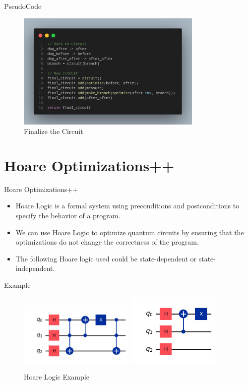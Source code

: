 \documentclass[10pt]{beamer}
\begin{document}
\begin{frame}{PseudoCode}
  \begin{figure}
    \centering
    \includegraphics[width=0.8\textwidth]{Images/code_4.png}
    \caption{Finalize the Circuit}
  \end{figure}
\end{frame}

\section{Hoare Optimizations++}
\begin{frame}{Hoare Optimizations++}
  \begin{itemize}
    \item Hoare Logic is a formal system using preconditions and postconditions to specify the behavior of a program.
    \item We can use Hoare Logic to optimize quantum circuits by ensuring that the optimizations do not change the correctness of the program.
    \item The following Hoare logic used could be state-dependent or state-independent.
  \end{itemize}
\end{frame}

\begin{frame}{Example}
  \begin{figure}
    \centering
    \includegraphics[width=0.5\textwidth]{Images/hoare_s1.png}
    \includegraphics[width=0.4\textwidth]{Images/hoare_s2.png}
    \caption{Hoare Logic Example}
  \end{figure}
\end{frame}
\end{document}
